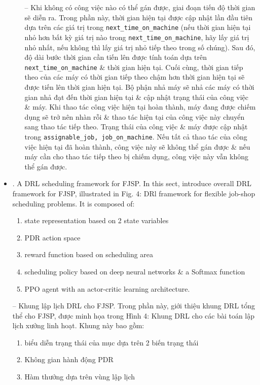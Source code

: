 \documentclass{article}
\begin{document}
\begin{itemize}
\begin{itemize}
        -- Khi không có công việc nào có thể gán được, giai đoạn tiến độ thời gian sẽ diễn ra. Trong phần này, thời gian hiện tại được cập nhật lần đầu tiên dựa trên các giá trị trong \verb|next_time_on_machine| (nếu thời gian hiện tại nhỏ hơn bất kỳ giá trị nào trong \verb|next_time_on_machine|, hãy lấy giá trị nhỏ nhất, nếu không thì lấy giá trị nhỏ tiếp theo trong số chúng). Sau đó, độ dài bước thời gian cần tiến lên được tính toán dựa trên \verb|next_time_on_machine| \& thời gian hiện tại. Cuối cùng, thời gian tiếp theo của các máy có thời gian tiếp theo chậm hơn thời gian hiện tại sẽ được tiến lên thời gian hiện tại. Bộ phận nhả máy sẽ nhả các máy có thời gian nhả đạt đến thời gian hiện tại \& cập nhật trạng thái của công việc \& máy. Khi thao tác công việc hiện tại hoàn thành, máy đang được chiếm dụng sẽ trở nên nhàn rỗi \& thao tác hiện tại của công việc này chuyển sang thao tác tiếp theo. Trạng thái của công việc \& máy được cập nhật trong \verb|assignable_job, job_on_machine|. Nếu tất cả thao tác của công việc hiện tại đã hoàn thành, công việc này sẽ không thể gán được \& nếu máy cần cho thao tác tiếp theo bị chiếm dụng, công việc này vẫn không thể gán được.
    \end{itemize}
    \item {. A DRL scheduling framework for FJSP.} In this sect, introduce overall DRL framework for FJSP, illustrated in {\sf Fig. 4: DRl framework for flexible job-shop scheduling problems}. It is composed of:
    \begin{enumerate}
        \item state representation based on 2 state variables
        \item PDR action space
        \item reward function based on scheduling area
        \item scheduling policy based on deep neural networks \& a Softmax function
        \item PPO agent with an actor-critic learning architecture.
    \end{enumerate}
    -- {\sf Khung lập lịch DRL cho FJSP.} Trong phần này, giới thiệu khung DRL tổng thể cho FJSP, được minh họa trong {\sf Hình 4: Khung DRL cho các bài toán lập lịch xưởng linh hoạt}. Khung này bao gồm:
    \begin{enumerate}
        \item biểu diễn trạng thái của mục dựa trên 2 biến trạng thái
        \item Không gian hành động PDR
        \item Hàm thưởng dựa trên vùng lập lịch

\end{enumerate}
\end{itemize}
\end{document}
